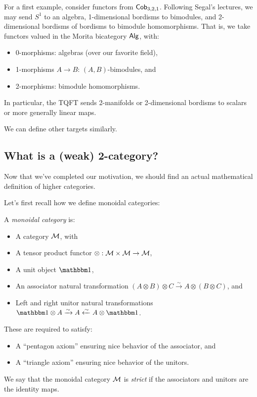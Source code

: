 \begin{ex}
	For a first example, consider functors from $\mathsf{Cob}_{3,2,1}$.
	Following Segal's lectures, we may send $S^1$ to an algebra, 1-dimensional bordisms to bimodules, and 2-dimensional bordisms of bordisms to bimodule homomorphisms.
	That is, we take functors valued in the Morita bicategory $\mathsf{Alg}$, with:
	\begin{itemize}
		\item 0-morphisms: algebras (over our favorite field),
		\item 1-morphisms $A \to B$: $(A, B)$-bimodules, and
		\item 2-morphisms: bimodule homomorphisms.
	\end{itemize}
	In particular, the TQFT sends 2-manifolds or 2-dimensional bordisms to scalars or more generally linear maps.
\end{ex}

We can define other targets similarly.

\subsection{What is a (weak) 2-category?}

Now that we've completed our motivation, we should find an actual mathematical definition of higher categories.

Let's first recall how we define monoidal categories:

\begin{dfn}
	A \emph{monoidal category} is:
	\begin{itemize}
		\item A category $\mathcal{M}$, with
		\item A tensor product functor $\otimes: \mathcal{M} \times \mathcal{M} \to \mathcal{M}$,
		\item A unit object $\onebb$,
		\item An associator natural transformation $(A \otimes B) \otimes C \xrightarrow{\sim} A \otimes (B \otimes C)$, and
		\item Left and right unitor natural transformations $\onebb \otimes A \xrightarrow{\sim} A \xleftarrow{\sim} A \otimes \onebb$.
	\end{itemize}
	These are required to satisfy:
	\begin{itemize}
		\item A ``pentagon axiom'' ensuring nice behavior of the associator, and
		\item A ``triangle axiom'' ensuring nice behavior of the unitors.
	\end{itemize}
	We say that the monoidal category $\mathcal{M}$ is \emph{strict} if the associators and unitors are the identity maps.
\end{dfn}


